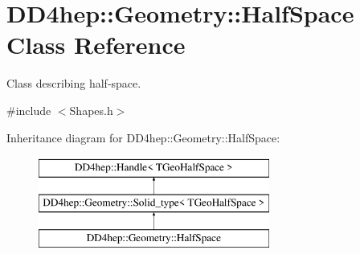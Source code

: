 \hypertarget{class_d_d4hep_1_1_geometry_1_1_half_space}{}\section{D\+D4hep\+:\+:Geometry\+:\+:Half\+Space Class Reference}
\label{class_d_d4hep_1_1_geometry_1_1_half_space}


Class describing half-\/space.  




{\ttfamily \#include $<$Shapes.\+h$>$}

Inheritance diagram for D\+D4hep\+:\+:Geometry\+:\+:Half\+Space\+:\begin{figure}[H]
\begin{center}
\leavevmode
\includegraphics[height=3.000000cm]{class_d_d4hep_1_1_geometry_1_1_half_space}
\end{center}
\end{figure}
